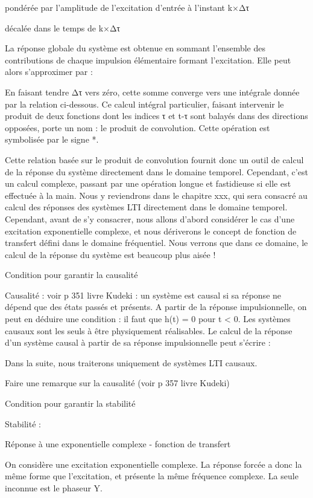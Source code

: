 \documentclass[]{article}
\begin{document}
pondérée par l'amplitude de l'excitation d'entrée à l'instant k×Δτ

décalée dans le temps de k×Δτ~

La réponse globale du système est obtenue en sommant l'ensemble des
contributions de chaque impulsion élémentaire formant l'excitation. Elle
peut alors s'approximer par :~

En faisant tendre Δτ vers zéro, cette somme converge vers une intégrale
donnée par la relation ci-dessous. Ce calcul intégral particulier,
faisant intervenir le produit de deux fonctions dont les indices τ et
t-τ sont balayés dans des directions opposées, porte un nom : le produit
de convolution. Cette opération est symbolisée par le signe *.~

Cette relation basée sur le produit de convolution fournit donc un outil
de calcul de la réponse du système directement dans le domaine temporel.
Cependant, c'est un calcul complexe, passant par une opération longue et
fastidieuse si elle est effectuée à la main. Nous y reviendrons dans le
chapitre xxx, qui sera consacré au calcul des réponses des systèmes LTI
directement dans le domaine temporel. Cependant, avant de s'y consacrer,
nous allons d'abord considérer le cas d'une excitation exponentielle
complexe, et nous dériverons le concept de fonction de transfert défini
dans le domaine fréquentiel. Nous verrons que dans ce domaine, le calcul
de la réponse du système est beaucoup plus aisée !

Condition pour garantir la causalité

Causalité : voir p 351 livre Kudeki : un système est causal si sa
réponse ne dépend que des états passés et présents. A partir de la
réponse impulsionnelle, on peut en déduire une condition : il faut que
h(t) = 0 pour t \textless{} 0. Les systèmes causaux sont les seuls à
être physiquement réalisables. Le calcul de la réponse d'un système
causal à partir de sa réponse impulsionnelle peut s'écrire :

Dans la suite, nous traiterons uniquement de systèmes LTI causaux.

Faire une remarque sur la causalité (voir p 357 livre Kudeki)

Condition pour garantir la stabilité

Stabilité :

Réponse à une exponentielle complexe - fonction de transfert

On considère une excitation exponentielle complexe. La réponse forcée a
donc la même forme que l'excitation, et présente la même fréquence
complexe. La seule inconnue est le phaseur Y.
\end{document}
